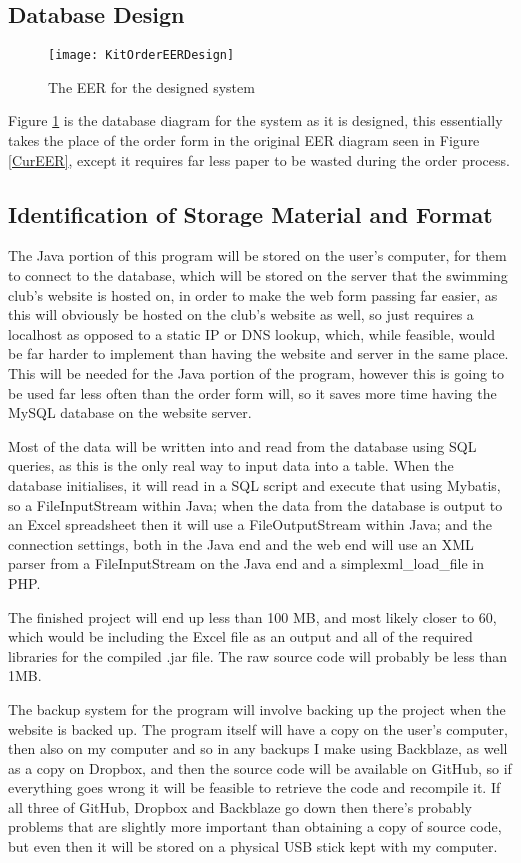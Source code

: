 \documentclass[
11pt, %
a4paper, %
oneside, %
headinclude,footinclude, %
BCOR5mm, %
]{scrartcl}
\begin{document}
\subsection{Database Design}
\begin{figure}[H]
	\centering
	\texttt{[image: KitOrderEERDesign]}
	\caption{The EER for the designed system}
	\label{EERDesign}	
\end{figure}
Figure \ref{EERDesign} is the database diagram for the system as it is designed, this essentially takes the place of the order form in the original EER diagram seen in Figure \ref{CurEER}, except it requires far less paper to be wasted during the order process.
\subsection{Identification of Storage Material and Format}
The Java portion of this program will be stored on the user's computer, for them to connect to the database, which will be stored on the server that the swimming club's website is hosted on, in order to make the web form passing far easier, as this will obviously be hosted on the club's website as well, so just requires a localhost as opposed to a static IP or DNS lookup, which, while feasible, would be far harder to implement than having the website and server in the same place. This will be needed for the Java portion of the program, however this is going to be used far less often than the order form will, so it saves more time having the MySQL database on the website server. \par Most of the data will be written into and read from the database using SQL queries, as this is the only real way to input data into a table. When the database initialises, it will read in a SQL script and execute that using Mybatis, so a FileInputStream within Java; when the data from the database is output to an Excel spreadsheet then it will use a FileOutputStream within Java; and the connection settings, both in the Java end and the web end will use an XML parser from a FileInputStream on the Java end and a simplexml\_load\_file in PHP.\par The finished project will end up less than 100 MB, and most likely closer to 60, which would be including the Excel file as an output and all of the required libraries for the compiled .jar file. The raw source code will probably be less than 1MB.\par The backup system for the program will involve backing up the project when the website is backed up. The program itself will have a copy on the user's computer, then also on my computer and so in any backups I make using Backblaze, as well as a copy on Dropbox, and then the source code will be available on GitHub, so if everything goes wrong it will be feasible to retrieve the code and recompile it. If all three of GitHub, Dropbox and Backblaze go down then there's probably problems that are slightly more important than obtaining a copy of source code, but even then it will be stored on a physical USB stick kept with my computer.
\end{document}
